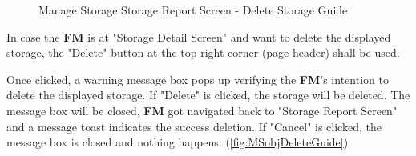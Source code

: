 \begin{figure}[H]
	\centering
  
    \vspace{10pt}
    
  
    \vspace{10pt}
    

    \caption{Manage Storage Storage Report Screen - Delete Storage Guide}
	\label{fig:MSreportDeleteGuide}
\end{figure}


\bigskip
In case the \textbf{FM} is at "Storage Detail Screen" and want to delete the displayed storage, the "Delete" button at the top right corner (page header) shall be used. 

Once clicked, a warning message box pops up verifying the \textbf{FM}'s intention to delete the displayed storage. If "Delete" is clicked, the storage will be deleted. The message box will be closed, \textbf{FM} got navigated back to "Storage Report Screen" and a message toast indicates the success deletion. If "Cancel" is clicked, the message box is closed and nothing happens.
(\autoref{fig:MSobjDeleteGuide})

